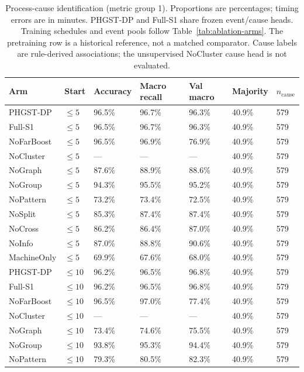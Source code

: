 \begin{table}[p]
\centering
\scriptsize
\setlength{\tabcolsep}{3pt}
\renewcommand{\arraystretch}{1.12}
\caption{Process-cause identification (metric group 1). Proportions are percentages; timing errors are in minutes. PHGST-DP and Full-S1 share frozen event/cause heads. Training schedules and event pools follow Table~\ref{tab:ablation-arms}. The pretraining row is a historical reference, not a matched comparator. Cause labels are rule-derived associations; the unsupervised NoCluster cause head is not evaluated.}
\label{tab:complete-4-1}
\begin{tabularx}{\textwidth}{@{}lXXXXXX@{}}
\toprule
Arm & Start & Accuracy & \textbf{Macro recall} & Val macro & Majority & $n_{\mathrm{cause}}$ \\
\midrule
PHGST-DP & $\le 5$ & 96.5\% & 96.7\% & 96.3\% & 40.9\% & 579 \\
Full-S1 & $\le 5$ & 96.5\% & 96.7\% & 96.3\% & 40.9\% & 579 \\
NoFarBoost & $\le 5$ & 96.5\% & 96.9\% & 76.9\% & 40.9\% & 579 \\
NoCluster & $\le 5$ & --- & --- & --- & 40.9\% & 579 \\
NoGraph & $\le 5$ & 87.6\% & 88.9\% & 88.6\% & 40.9\% & 579 \\
NoGroup & $\le 5$ & 94.3\% & 95.5\% & 95.2\% & 40.9\% & 579 \\
NoPattern & $\le 5$ & 73.2\% & 73.4\% & 72.5\% & 40.9\% & 579 \\
NoSplit & $\le 5$ & 85.3\% & 87.4\% & 87.4\% & 40.9\% & 579 \\
NoCross & $\le 5$ & 86.2\% & 86.4\% & 87.0\% & 40.9\% & 579 \\
NoInfo & $\le 5$ & 87.0\% & 88.8\% & 90.6\% & 40.9\% & 579 \\
MachineOnly & $\le 5$ & 69.9\% & 67.6\% & 68.0\% & 40.9\% & 579 \\
\midrule
PHGST-DP & $\le 10$ & 96.2\% & 96.5\% & 96.8\% & 40.9\% & 579 \\
Full-S1 & $\le 10$ & 96.2\% & 96.5\% & 96.8\% & 40.9\% & 579 \\
NoFarBoost & $\le 10$ & 96.5\% & 97.0\% & 77.4\% & 40.9\% & 579 \\
NoCluster & $\le 10$ & --- & --- & --- & 40.9\% & 579 \\
NoGraph & $\le 10$ & 73.4\% & 74.6\% & 75.5\% & 40.9\% & 579 \\
NoGroup & $\le 10$ & 93.8\% & 95.3\% & 94.4\% & 40.9\% & 579 \\
NoPattern & $\le 10$ & 79.3\% & 80.5\% & 82.3\% & 40.9\% & 579 \\

\end{tabularx}
\end{table}
